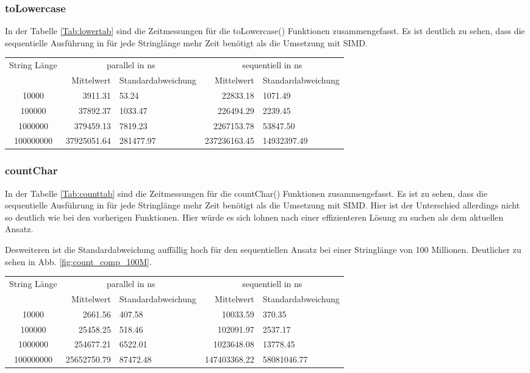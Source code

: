 \documentclass[plainarticle,zihtitle,german,final,hyperref,utf8]{zihpub}
\begin{document}
\subsubsection{toLowercase}
In der Tabelle \ref{Tab:lowertab} sind die Zeitmessungen für die toLowercase() Funktionen zusammengefasst.
Es ist deutlich zu sehen, dass die sequentielle Ausführung in für jede Stringlänge mehr Zeit benötigt als die Umsetzung mit SIMD.
\newline
\begin{tabular}{|c|r|l|r|l|}
	\hline
	\multicolumn{1}{|c|}{String Länge} & \multicolumn{2}{c|}{parallel in ns} & \multicolumn{2}{c|}{sequentiell in ns} \\
	\cline{2-5}
	& Mittelwert & Standardabweichung  & Mittelwert & Standardabweichung \\
	\hline
	10000 & 3911.31 & 53.24 & 22833.18 & 1071.49 \\
	100000 & 37892.37 & 1033.47 & 226494.29 & 2239.45 \\
	1000000 & 379459.13 & 7819.23 & 2267153.78 & 53847.50 \\
	100000000 & 37925051.64 & 281477.97 & 237236163.45 & 14932397.49 \\
	\hline
\end{tabular}
\label{Tab:lowertab}

\subsubsection{countChar}
In der Tabelle \ref{Tab:counttab} sind die Zeitmessungen für die countChar() Funktionen zusammengefasst.
Es ist zu sehen, dass die sequentielle Ausführung in für jede Stringlänge mehr Zeit benötigt als die Umsetzung mit SIMD. Hier ist der Unterschied allerdings nicht so deutlich wie bei den vorherigen Funktionen. Hier würde es sich lohnen nach einer effizienteren Lösung zu suchen als dem aktuellen Ansatz.

Desweiteren ist die Standardabweichung auffällig hoch für den sequentiellen Ansatz bei einer Stringlänge von 100 Millionen. Deutlicher zu sehen in Abb. \ref{fig:count_comp_100M}.
\newline
\begin{tabular}{|c|r|l|r|l|}
	\hline
	\multicolumn{1}{|c|}{String Länge} & \multicolumn{2}{c|}{parallel in ns} & \multicolumn{2}{c|}{sequentiell in ns} \\
	\cline{2-5}
	& Mittelwert & Standardabweichung  & Mittelwert & Standardabweichung \\
	\hline
	10000 & 2661.56 & 407.58 & 10033.59 & 370.35 \\
	100000 & 25458.25 & 518.46 & 102091.97 & 2537.17 \\
	1000000 & 254677.21 & 6522.01 & 1023648.08 & 13778.45 \\
	100000000 & 25652750.79 & 87472.48 & 147403368.22 & 58081046.77 \\

	\hline
\end{tabular}
\label{Tab:counttab}
\end{document}
